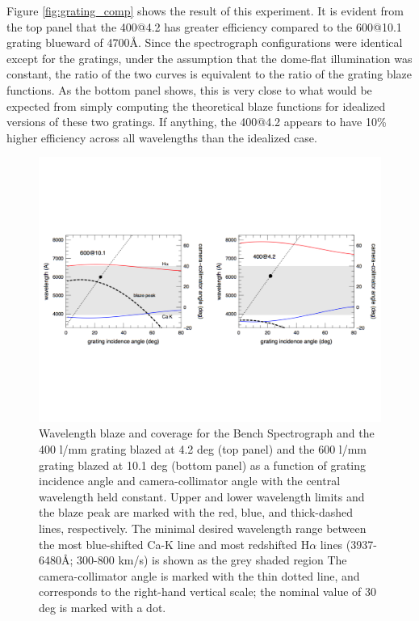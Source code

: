 Figure \ref{fig:grating_comp} shows the result of this experiment. It
is evident from the top panel that the 400@4.2 has greater efficiency
compared to the 600@10.1 grating blueward of 4700\AA. Since the
spectrograph configurations were identical except for the gratings,
under the assumption that the dome-flat illumination was constant, the
ratio of the two curves is equivalent to the ratio of the grating
blaze functions. As the bottom panel shows, this is very close to what
would be expected from simply computing the theoretical blaze
functions for idealized versions of these two gratings. If anything,
the 400@4.2 appears to have 10\% higher efficiency across all
wavelengths than the idealized case.

\begin{figure}[htb]
  \centering
\vskip -1.25in
  \includegraphics[width=\textwidth]{Appendix/figs/blaze_plot_land.pdf}
\vskip -1.25in
\caption[Comparison of coverage and blaze for 400 and 600 l/mm
gratings]{\label{fig:spec_config}\fixspacing Wavelength blaze and
  coverage for the Bench Spectrograph and the 400 l/mm grating blazed
  at 4.2 deg (top panel) and the 600 l/mm grating blazed at 10.1 deg
  (bottom panel) as a function of grating incidence angle and
  camera-collimator angle with the central wavelength held
  constant. Upper and lower wavelength limits and the blaze peak are
  marked with the red, blue, and thick-dashed lines, respectively. The
  minimal desired wavelength range between the most blue-shifted Ca-K
  line and most redshifted H$\alpha$ lines (3937-6480\AA; 300-800
  km/s) is shown as the grey shaded region The camera-collimator angle
  is marked with the thin dotted line, and corresponds to the
  right-hand vertical scale; the nominal value of 30 deg is marked
  with a dot.}
\end{figure}

